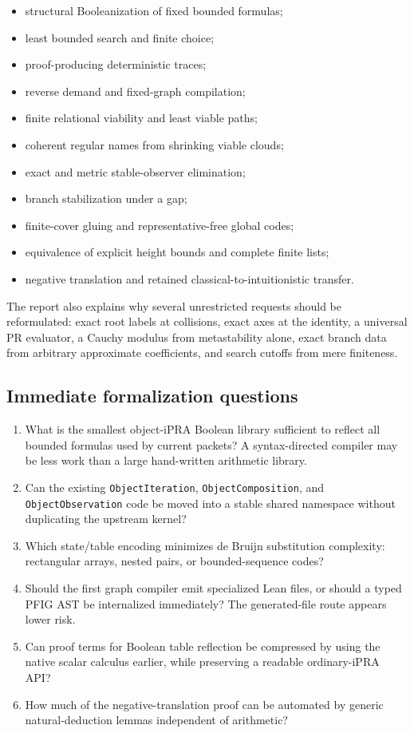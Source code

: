 \begin{itemize}
\item structural Booleanization of fixed bounded formulas;
\item least bounded search and finite choice;
\item proof-producing deterministic traces;
\item reverse demand and fixed-graph compilation;
\item finite relational viability and least viable paths;
\item coherent regular names from shrinking viable clouds;
\item exact and metric stable-observer elimination;
\item branch stabilization under a gap;
\item finite-cover gluing and representative-free global codes;
\item equivalence of explicit height bounds and complete finite lists;
\item negative translation and retained classical-to-intuitionistic transfer.
\end{itemize}

The report also explains why several unrestricted requests should be reformulated: exact root labels at collisions, exact axes at the identity, a universal PR evaluator, a Cauchy modulus from metastability alone, exact branch data from arbitrary approximate coefficients, and search cutoffs from mere finiteness.

\subsection{Immediate formalization questions}

\begin{enumerate}
\item What is the smallest object-iPRA Boolean library sufficient to reflect all bounded formulas used by current packets?  A syntax-directed compiler may be less work than a large hand-written arithmetic library.
\item Can the existing \texttt{ObjectIteration}, \texttt{ObjectComposition}, and \texttt{ObjectObservation} code be moved into a stable shared namespace without duplicating the upstream kernel?
\item Which state/table encoding minimizes de Bruijn substitution complexity: rectangular arrays, nested pairs, or bounded-sequence codes?
\item Should the first graph compiler emit specialized Lean files, or should a typed PFIG AST be internalized immediately?  The generated-file route appears lower risk.
\item Can proof terms for Boolean table reflection be compressed by using the native scalar calculus earlier, while preserving a readable ordinary-iPRA API?
\item How much of the negative-translation proof can be automated by generic natural-deduction lemmas independent of arithmetic?
\end{enumerate}

